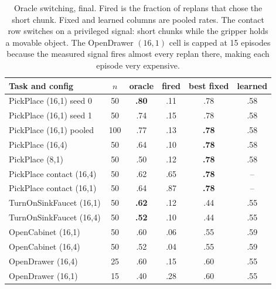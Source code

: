 \documentclass[11pt]{article}
\begin{document}
\begin{table}[h]
\centering
\small
\begin{tabular}{lccccc}
\toprule
Task and config & $n$ & oracle & fired & best fixed & learned \\
\midrule
PickPlace (16,1) seed 0 & 50 & \textbf{.80} & .11 & .78 & .58 \\
PickPlace (16,1) seed 1 & 50 & .74 & .15 & .78 & .58 \\
PickPlace (16,1) pooled & 100 & .77 & .13 & \textbf{.78} & .58 \\
PickPlace (16,4)        & 50 & .64 & .10 & \textbf{.78} & .58 \\
PickPlace (8,1)         & 50 & .50 & .12 & \textbf{.78} & .58 \\
PickPlace contact (16,4) & 50 & .62 & .65 & \textbf{.78} & -- \\
PickPlace contact (16,1) & 50 & .64 & .87 & \textbf{.78} & -- \\
TurnOnSinkFaucet (16,1) & 50 & \textbf{.62} & .12 & .44 & .55 \\
TurnOnSinkFaucet (16,4) & 50 & \textbf{.52} & .10 & .44 & .55 \\
OpenCabinet (16,1)      & 50 & .60 & .06 & .55 & .59 \\
OpenCabinet (16,4)      & 50 & .52 & .04 & .55 & .59 \\
OpenDrawer (16,4)       & 25 & .60 & .15 & .60 & .55 \\
OpenDrawer (16,1)       & 15 & .40 & .28 & .60 & .55 \\
\bottomrule
\end{tabular}
\caption{Oracle switching, final. Fired is the fraction of replans that
chose the short chunk. Fixed and learned columns are pooled rates. The
contact row switches on a privileged signal: short chunks while the gripper
holds a movable object. The OpenDrawer $(16,1)$ cell is capped at 15
episodes because the measured signal fires almost every replan there,
making each episode very expensive.}
\label{tab:oracle}
\end{table}
\end{document}
